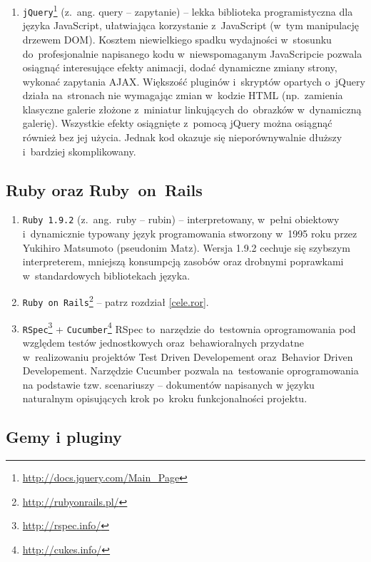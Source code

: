 \begin{enumerate}
  \item \texttt{jQuery}\footnote{\url{http://docs.jquery.com/Main_Page}} (z.~ang. query -- zapytanie) -- lekka biblioteka programistyczna dla języka JavaScript, ułatwiająca korzystanie z~JavaScript (w~tym manipulację drzewem DOM). Kosztem niewielkiego spadku wydajności w~stosunku do~profesjonalnie napisanego kodu w~niewspomaganym JavaScripcie pozwala osiągnąć interesujące efekty animacji, dodać dynamiczne zmiany strony, wykonać zapytania AJAX. Większość pluginów i~skryptów opartych o~jQuery działa na~stronach nie wymagając zmian w~kodzie HTML (np.~zamienia klasyczne galerie złożone z~miniatur linkujących do~obrazków w~dynamiczną galerię). Wszystkie efekty osiągnięte z~pomocą jQuery można osiągnąć również bez jej użycia. Jednak kod okazuje się nieporównywalnie dłuższy i~bardziej skomplikowany.
\end{enumerate}

\subsection{Ruby oraz Ruby~on~Rails}

\begin{enumerate}
  \item \texttt{Ruby 1.9.2} (z.~ang.~ruby -- rubin) -- interpretowany, w~pełni obiektowy i~dynamicznie typowany język programowania stworzony w~1995 roku przez Yukihiro Matsumoto (pseudonim Matz). Wersja 1.9.2 cechuje się szybszym interpreterem, mniejszą konsumpcją zasobów oraz drobnymi poprawkami w~standardowych bibliotekach języka.
  \item \texttt{Ruby~on~Rails}\footnote{\url{http://rubyonrails.pl/}} -- patrz rozdział \ref{cele.ror}.
  \item \texttt{RSpec}\footnote{\url{http://rspec.info/}} + \texttt{Cucumber}\footnote{\url{http://cukes.info/}} RSpec to~narzędzie do~testownia oprogramowania pod względem testów jednostkowych oraz~behawioralnych przydatne w~realizowaniu projektów Test Driven Developement oraz~Behavior Driven Developement. Narzędzie Cucumber pozwala na~testowanie oprogramowania na podstawie tzw. scenariuszy -- dokumentów napisanych w języku naturalnym opisujących krok po~kroku funkcjonalności projektu.
\end{enumerate}

\subsection{Gemy i pluginy} \label{technologie.gemy}

